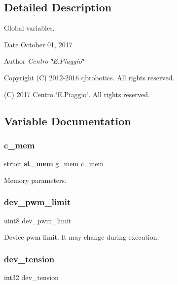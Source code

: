 \subsection{Detailed Description}
Global variables. 

\begin{DoxyDate}{Date}
October 01, 2017 
\end{DoxyDate}
\begin{DoxyAuthor}{Author}
{\itshape Centro \char`\"{}\+E.\+Piaggio\char`\"{}} 
\end{DoxyAuthor}
\begin{DoxyCopyright}{Copyright}
(C) 2012-\/2016 qbrobotics. All rights reserved. 

(C) 2017 Centro \char`\"{}\+E.\+Piaggio\char`\"{}. All rights reserved. 
\end{DoxyCopyright}


\subsection{Variable Documentation}
\mbox{\label{globals_8c_a44c3cbd8e234e0816f0334e29646a800}} 
\subsubsection{c\+\_\+mem}
{\footnotesize\ttfamily struct \textbf{ st\+\_\+mem} g\+\_\+mem c\+\_\+mem}

Memory parameters. \mbox{\label{globals_8c_a21f4f67e4203dea0b9956589eaa6cef3}} 
\subsubsection{dev\+\_\+pwm\+\_\+limit}
{\footnotesize\ttfamily uint8 dev\+\_\+pwm\+\_\+limit}

Device pwm limit. It may change during execution. \mbox{\label{globals_8c_a53a494e9edc739a4f7c884778d1a93b1}} 
\subsubsection{dev\+\_\+tension}
{\footnotesize\ttfamily int32 dev\+\_\+tension}

